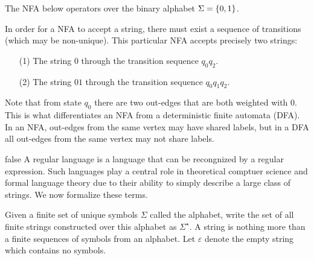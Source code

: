 \begin{example}[NFA]
  The NFA below operators over the binary alphabet
  \(\Sigma = \left\{0, 1\right\}\).

  \begin{center}
  \end{center}

  In order for a NFA to accept a string, there must exist a sequence
  of transitions (which may be non-unique).
  This particular NFA accepts precisely two strings:
  \begin{enumerate}
    \item[(1)]
      The string \(0\) through the transition sequence \(q_0 q_2\).

    \item[(2)]
      The string \(01\) through the transition sequence \(q_0 q_1 q_2\).
  \end{enumerate}
  Note that from state \(q_0\) there are two out-edges that
  are both weighted with \(0\).
  This is what differentiates an NFA from a
  deterministic finite automata (DFA).
  In an NFA, out-edges from the same vertex may have shared labels,
  but in a DFA all out-edges from the same vertex may not share labels.

\end{example}



\if false
A regular language is a language that can be recongnized by a regular
expression.
Such languages play a central role in theoretical comptuer science
and formal language theory due to their ability to simply describe a
large class of strings.
We now formalize these terms.

Given a finite set of unique symbols \(\Sigma\) called the alphabet,
write the set of all finite strings constructed over this alphabet
as \(\Sigma^\star\).
A string is nothing more than a finite sequences of symbols from an alphabet.
Let \(\varepsilon\) denote the empty string which contains no symbols.


